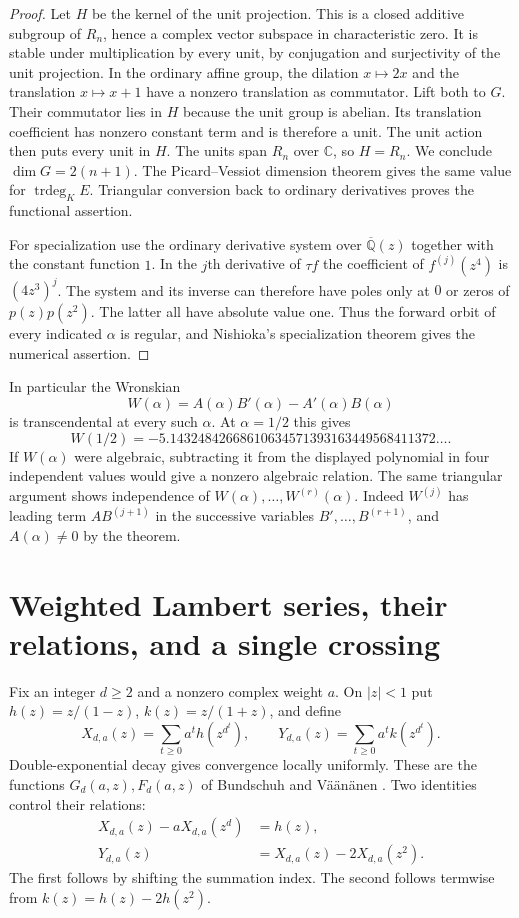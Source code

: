 \documentclass[11pt,a4paper]{article}
\theoremstyle{definition}
\theoremstyle{remark}
\numberwithin{equation}{section}
\begin{document}
\begin{proof}
Let $H$ be the kernel of the unit projection. This is a closed additive
subgroup of $R_n$, hence a complex vector subspace in characteristic
zero. It is stable under multiplication by every unit, by conjugation
and surjectivity of the unit projection. In the ordinary affine group,
the dilation $x\mapsto 2x$ and the translation $x\mapsto x+1$ have a
nonzero translation as commutator. Lift both to $G$. Their commutator
lies in $H$ because the unit group is abelian. Its translation
coefficient has nonzero constant term and is therefore a unit. The
unit action then puts every unit in $H$. The units span $R_n$ over
$\mathbb C$, so $H=R_n$. We conclude $\dim G=2(n+1)$. The
Picard--Vessiot dimension theorem gives the same value for
$\operatorname{trdeg}_K E$. Triangular conversion back to ordinary
derivatives proves the functional assertion.

For specialization use the ordinary derivative system over
$\overline{\mathbb Q}(z)$ together with the constant function $1$.
In the $j$th derivative of $\tau f$ the coefficient of
$f^{(j)}(z^4)$ is $(4z^3)^j$. The system and its inverse can therefore
have poles only at $0$ or zeros of $p(z)p(z^2)$. The latter all have
absolute value one. Thus the forward orbit of every indicated $\alpha$
is regular, and Nishioka's specialization theorem
\cite[Theorem 4.2.1]{sn-nish} gives the numerical assertion.
\end{proof}

In particular the Wronskian
\[
             W(\alpha)=A(\alpha)B'(\alpha)-A'(\alpha)B(\alpha)
\]
is transcendental at every such $\alpha$. At $\alpha=1/2$ this gives
\[
 W(1/2)=-5.14324842668610634571393163449568411372\ldots .
\]
If $W(\alpha)$ were algebraic, subtracting it from the displayed polynomial in four independent
values would give a nonzero algebraic relation. The same triangular
argument shows independence of $W(\alpha),\ldots,W^{(r)}(\alpha)$.
Indeed $W^{(j)}$ has leading term $A B^{(j+1)}$ in the successive
variables $B',\ldots,B^{(r+1)}$, and $A(\alpha)\ne0$ by the theorem.
 
\section{Weighted Lambert series, their relations, and a single crossing}
\label{sec:weightedlambert}
Fix an integer $d\ge2$ and a nonzero complex weight $a$. On $|z|<1$
put $h(z)=z/(1-z)$, $k(z)=z/(1+z)$, and define
\[
 X_{d,a}(z)=\sum_{t\ge0}a^t h(z^{d^t}),\qquad
 Y_{d,a}(z)=\sum_{t\ge0}a^t k(z^{d^t}).
\]
Double-exponential decay gives convergence locally uniformly. These are
the functions $G_d(a,z),F_d(a,z)$ of Bundschuh and V\"a\"an\"anen
\cite[equation (2.9)]{sn-lambert}. Two identities control their relations:
\begin{align}
 X_{d,a}(z)-aX_{d,a}(z^d)&=h(z),\label{eq:ls-shift}\\
 Y_{d,a}(z)&=X_{d,a}(z)-2X_{d,a}(z^2).\label{eq:ls-plus}
\end{align}
The first follows by shifting the summation index. The second follows
termwise from $k(z)=h(z)-2h(z^2)$.
\end{document}
